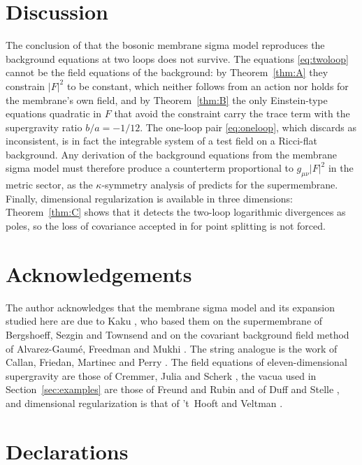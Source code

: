 \documentclass[11pt]{amsart}
\theoremstyle{definition}
\begin{document}
\section{Discussion}\label{sec:discussion}

The conclusion of \cite{Kak00} that the bosonic membrane sigma model reproduces the background equations at two loops does not survive. The equations \eqref{eq:twoloop} cannot be the field equations of the background: by Theorem~\ref{thm:A} they constrain $|F|^2$ to be constant, which neither follows from an action nor holds for the membrane's own field, and by Theorem~\ref{thm:B} the only Einstein-type equations quadratic in $F$ that avoid the constraint carry the trace term with the supergravity ratio $b/a=-1/12$. The one-loop pair \eqref{eq:oneloop}, which \cite{Kak00} discards as inconsistent, is in fact the integrable system of a test field on a Ricci-flat background. Any derivation of the background equations from the membrane sigma model must therefore produce a counterterm proportional to $g_{\mu\nu}|F|^2$ in the metric sector, as the $\kappa$-symmetry analysis of \cite{BST87} predicts for the supermembrane. Finally, dimensional regularization is available in three dimensions: Theorem~\ref{thm:C} shows that it detects the two-loop logarithmic divergences as poles, so the loss of covariance accepted in \cite{Kak00} for point splitting is not forced.

\section*{Acknowledgements}

The author acknowledges that the membrane sigma model and its expansion studied here are due to Kaku \cite{Kak00}, who based them on the supermembrane of Bergshoeff, Sezgin and Townsend \cite{BST87} and on the covariant background field method of Alvarez-Gaum\'e, Freedman and Mukhi \cite{AGFM81}. The string analogue is the work of Callan, Friedan, Martinec and Perry \cite{CFMP85}. The field equations of eleven-dimensional supergravity are those of Cremmer, Julia and Scherk \cite{CJS78}, the vacua used in Section~\ref{sec:examples} are those of Freund and Rubin \cite{FR80} and of Duff and Stelle \cite{DS91}, and dimensional regularization is that of 't~Hooft and Veltman \cite{tHV72}.

\section*{Declarations}
\end{document}
